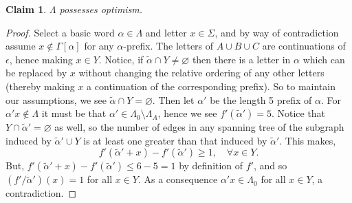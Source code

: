 \documentclass[11pt]{article}
\newtheorem*{claim}{Claim}
\newcommand{\univ}{\Sigma}
\newcommand{\glang}{\Lambda}
\begin{document}
\begin{claim}
    $\glang$ possesses optimism.
\end{claim}
\begin{proof}
    Select a basic word $\alpha \in \glang$ and letter $x \in\univ$, and by way of contradiction assume $x \notin\Gamma[\alpha]$ for any $\alpha$-prefix.
    The letters of $A\cup B\cup C$ are continuations of $\epsilon$, hence making $x \in Y$.
    Notice, if $\widetilde{\alpha}\cap Y \neq \varnothing$ then there is a letter in $\alpha$ which can be replaced by $x$ without changing the relative ordering of any other letters (thereby making $x$ a continuation of the corresponding prefix).
    So to maintain our assumptions, we see $\widetilde{\alpha}\cap Y =\varnothing$.
    Then let $\alpha'$ be the length 5 prefix of $\alpha$.
    For $\alpha'x \notin \glang$ it must be that $\alpha' \in \glang_0\setminus\glang_A$, hence we see $f'(\widetilde{\alpha}') = 5$.
    Notice that $Y \cap \widetilde{\alpha}' = \varnothing$ as well, so the number of edges in any spanning tree of the subgraph induced by $\widetilde{\alpha}'\cup Y$ is at least one greater than that induced by $\widetilde{\alpha}'$.
    This makes,
    \[
        f'(\widetilde{\alpha}'+ x) - f'(\widetilde{\alpha}') \geq 1,\quad\forall x \in Y.
    \]
    But, $f'(\widetilde{\alpha}'+ x) - f'(\widetilde{\alpha}') \leq 6 - 5 = 1$ by definition of $f'$, and so $\left(f'/\widetilde{\alpha}'\right)(x) = 1$ for all $x \in Y$.
    As a consequence $\alpha' x \in \glang_0$ for all $x \in Y$, a contradiction.
\end{proof}
\end{document}
